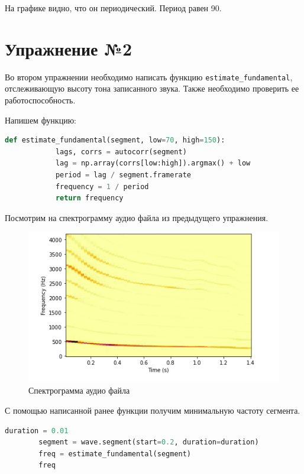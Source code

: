 \documentclass[a4paper, 14pt]{extarticle}
\begin{document}
    На графике видно, что он периодический.
    Период равен 90.

    \newpage


    \section{Упражнение №2}
    \label{sec:2}

    Во втором упражнении необходимо написать функцию \texttt{estimate\_fundamental}, отслеживающую высоту тона записанного звука.
    Также необходимо проверить ее работоспособность.

    Напишем функцию:

    \begin{lstlisting}[language=Python, caption= Функция estimate\_fundamental, label={lst:estimate_fundamental}]
        def estimate_fundamental(segment, low=70, high=150):
            lags, corrs = autocorr(segment)
            lag = np.array(corrs[low:high]).argmax() + low
            period = lag / segment.framerate
            frequency = 1 / period
            return frequency
    \end{lstlisting}

    Посмотрим на спектрограмму аудио файла из предыдущего упражнения.

    \begin{figure}[H]
        \centering
        \includegraphics[width=0.8\linewidth]{wave_spectrogram}
        \caption{Спектрограмма аудио файла}
        \label{fig:wave_spectrogram}
    \end{figure}

    С помощью написанной ранее функции получим минимальную частоту сегмента.

    \begin{lstlisting}[language=Python, caption= Получение минимальной частоты сегмента, label={lst:use_estimate_fundamental}]
        duration = 0.01
        segment = wave.segment(start=0.2, duration=duration)
        freq = estimate_fundamental(segment)
        freq
    \end{lstlisting}
\end{document}
